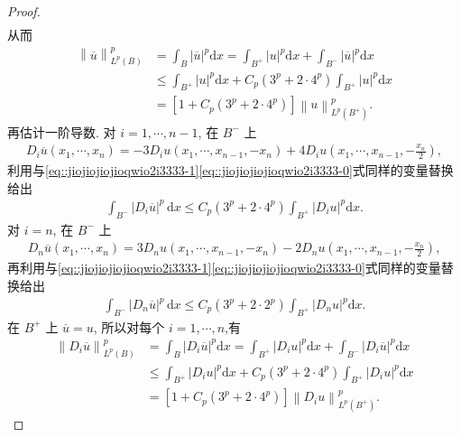 \documentclass[../../main.tex]{subfiles}
\begin{document}
\begin{proof}
\begin{align*}
\end{align*}
从而
\begin{align}
\left\| \overline{u} \right\| _{L^p\left( B \right)}^{p}&=\int_B{\left| \overline{u} \right|^p\mathrm{d}x}=\int_{B^+}{\left| u \right|^p\mathrm{d}x}+\int_{B^-}{\left| \overline{u} \right|^p\mathrm{d}x}
\nonumber \\
&\leqslant \int_{B^+}{\left| u \right|^p\mathrm{d}x}+C_p\left( 3^p+2\cdot 4^p \right) \int_{B^+}{\left| u \right|^p\mathrm{d}x}
\nonumber \\
&=\left[ 1+C_p\left( 3^p+2\cdot 4^p \right) \right] \left\| u \right\| _{L^p\left( B^+ \right)}^{p}.\label{eq:::HJiuhj3u892HFFHJIOEJO}
\end{align}
再估计一阶导数. 对 \(i=1,\cdots,n-1\), 在 \(B^-\) 上
\begin{align*}
D_i\overline{u}(x_1,\cdots,x_n)
=-3D_i u(x_1,\cdots,x_{n-1},-x_n)
+4D_i u\left(x_1,\cdots,x_{n-1},-\frac{x_n}{2}\right),
\end{align*}
利用与\eqref{eq::jiojiojiojioqwio2i3333-1}\eqref{eq::jiojiojiojioqwio2i3333-0}式同样的变量替换给出
\begin{align*}
\int_{B^-}|D_i\overline{u}|^p\,\mathrm{d}x
\leqslant C_p(3^p+2\cdot 4^p)\int_{B^+}{\left| D_iu \right|^p\mathrm{d}x}.
\end{align*}
对 \(i=n\), 在 \(B^-\) 上
\begin{align*}
D_n\overline{u}(x_1,\cdots,x_n)
=3D_n u(x_1,\cdots,x_{n-1},-x_n)
-2D_n u\left(x_1,\cdots,x_{n-1},-\frac{x_n}{2}\right),
\end{align*}
再利用与\eqref{eq::jiojiojiojioqwio2i3333-1}\eqref{eq::jiojiojiojioqwio2i3333-0}式同样的变量替换给出
\begin{align*}
\int_{B^-}|D_n\overline{u}|^p\,\mathrm{d}x
\leqslant C_p(3^p+2\cdot 2^p)\int_{B^+}{\left| D_nu \right|^p\mathrm{d}x}.
\end{align*}
在 \(B^+\) 上 \(\overline{u}=u\), 所以对每个 \(i=1,\cdots,n\),有
\begin{align}
\left\| D_i\overline{u} \right\| _{L^p\left( B \right)}^{p}&=\int_B{\left| D_i\overline{u} \right|^p\mathrm{d}x}=\int_{B^+}{\left| D_iu \right|^p\mathrm{d}x}+\int_{B^-}{\left| D_i\overline{u} \right|^p\mathrm{d}x}
\nonumber \\
&\leqslant \int_{B^+}{\left| D_iu \right|^p\mathrm{d}x}+C_p\left( 3^p+2\cdot 4^p \right) \int_{B^+}{\left| D_iu \right|^p\mathrm{d}x}
\nonumber \\
&=\left[ 1+C_p\left( 3^p+2\cdot 4^p \right) \right] \left\| D_iu \right\| _{L^p\left( B^+ \right)}^{p}.\label{eq:::HJiuhj3u892HFFHJIOEJO-1}

\end{align}
\end{proof}
\end{document}
